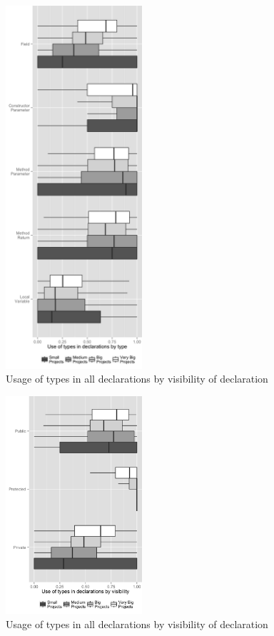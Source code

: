 \documentclass[preprint]{sigplanconf}
\begin{document}
\begin{figure}[h]
\centering 
\includegraphics[width=0.45\textwidth]{../analysis/result/size/comparison/boxplots/6_declarations_by_type.png} 
\caption{Usage of types in all declarations by visibility of declaration}
\label{fig:tipo_declaracao} 
\end{figure}

\begin{figure}[h]
\centering 
\includegraphics[width=0.45\textwidth]{../analysis/result/size/comparison/boxplots/23_declarations_by_visibility.png} 
\caption{Usage of types in all declarations by visibility of declaration}
\label{fig:tipo_declaracao} 
\end{figure}
\end{document}
